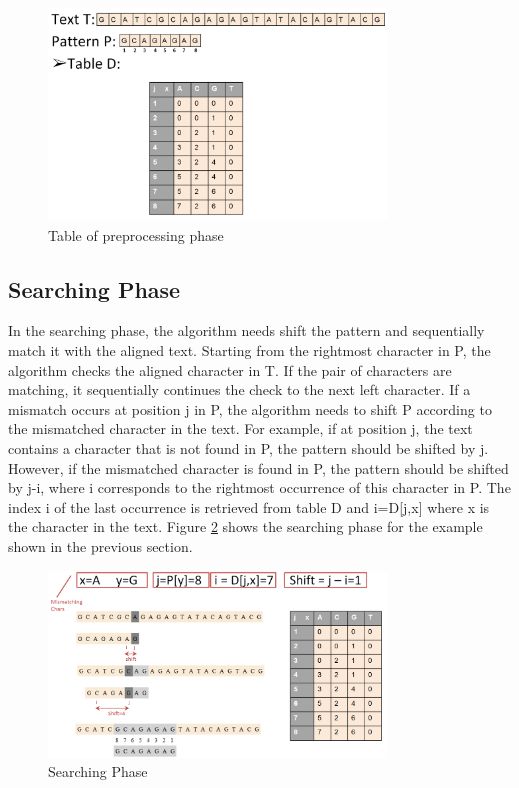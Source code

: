 \documentclass[paper=a4, fontsize=11pt]{scrartcl} %
\numberwithin{equation}{section} %
\numberwithin{figure}{section} %
\numberwithin{table}{section} %
\begin{document}
\begin{figure}[h!]
\centering
\includegraphics[width=0.8\textwidth]{figures/Example_Table.png}
\caption{Table of preprocessing phase}
\label{table}
\end{figure}

\subsection{Searching Phase}
In the searching phase, the algorithm needs shift the pattern and sequentially match it with the aligned text. Starting from the rightmost character in P, the algorithm checks the aligned character in T. If the pair of characters are matching, it sequentially continues the check to the next left character. If a mismatch occurs at position j in P, the algorithm needs to shift P according to the mismatched character in the text. For example, if at position j, the text contains a character that is not found in P, the pattern should be shifted by j. However, if the mismatched character is found in P, the pattern should be shifted by j-i, where i corresponds to the rightmost occurrence of this character in P. The index i of the last occurrence is retrieved from table D and i=D[j,x] where x is the character in the text. Figure \ref{search} shows the searching phase for the example shown in the previous section.

\begin{figure}[h!]
\centering
\includegraphics[width=0.8\textwidth]{figures/searching_phase.png}
\caption{Searching Phase}
\label{search}
\end{figure}
\end{document}

